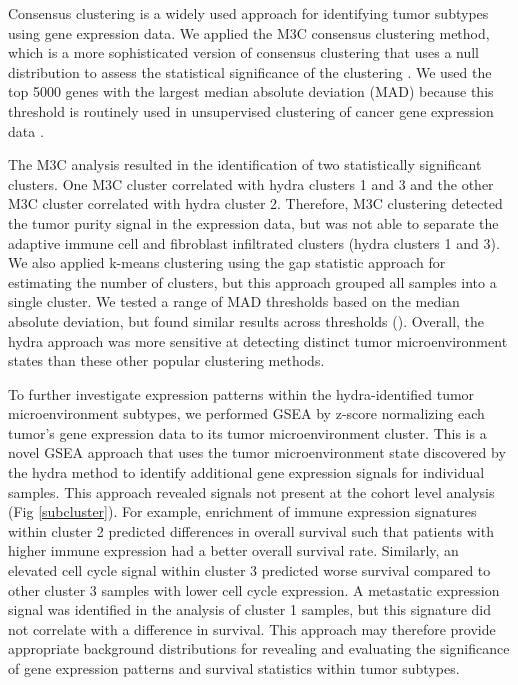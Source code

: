 \documentclass[10pt,letterpaper]{article}
\begin{document}
Consensus clustering is a widely used approach for identifying tumor subtypes using gene expression data. We applied the M3C consensus clustering method, which is a more sophisticated version of consensus clustering that uses a null distribution to assess the statistical significance of the clustering \cite{johnM3CMonteCarlo2018, wilkersonConsensusClusterPlusClassDiscovery2010a}. We used the top 5000 genes with the largest median absolute deviation (MAD) because this threshold is routinely used in unsupervised clustering of cancer gene expression data \cite{bourgonIndependentFilteringIncreases2010, tritchlerFilteringGenesCluster2009, carcamo-oriveAnalysisTranscriptionalVariability2017}.

The M3C analysis resulted in the identification of two statistically significant clusters. One M3C cluster correlated with hydra clusters 1 and 3 and the other M3C cluster correlated with hydra cluster 2. Therefore, M3C clustering detected the tumor purity signal in the expression data, but was not able to separate the adaptive immune cell and fibroblast infiltrated clusters (hydra clusters 1 and 3). We also applied k-means clustering using the gap statistic approach \cite{tibshirani2001estimating,maechler2012cluster} for estimating the number of clusters, but this approach grouped all samples into a single cluster. We tested a range of MAD thresholds based on the median absolute deviation, but found similar results across thresholds (). Overall, the hydra approach was more sensitive at detecting distinct tumor microenvironment states than these other popular clustering methods.

To further investigate expression patterns within the hydra-identified tumor microenvironment subtypes, we performed GSEA by z-score normalizing each tumor’s gene expression data to its tumor microenvironment cluster. This is a novel GSEA approach that uses the tumor microenvironment state discovered by the hydra method to identify additional gene expression signals for individual samples. This approach revealed signals not present at the cohort level analysis (Fig \ref{subcluster}). For example, enrichment of immune expression signatures within cluster 2 predicted differences in overall survival such that patients with higher immune expression had a better overall survival rate. Similarly, an elevated cell cycle signal within cluster 3 predicted worse survival compared to other cluster 3 samples with lower cell cycle expression. A metastatic expression signal was identified in the analysis of cluster 1 samples, but this signature did not correlate with a difference in survival. This approach may therefore provide appropriate background distributions for revealing and evaluating the significance of gene expression patterns and survival statistics within tumor subtypes.
\end{document}

